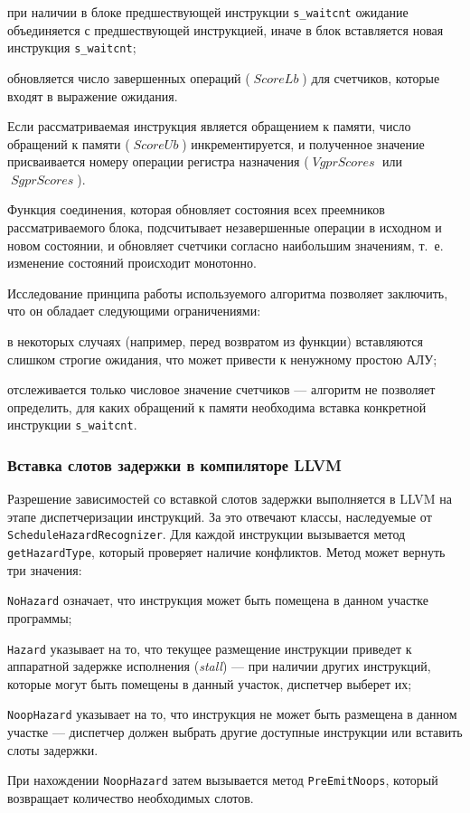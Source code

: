 \documentclass[a4paper,14pt]{extarticle}
\newcommand{\var}[1]{\mathop{\mathit{#1}}}
\begin{document}
{\begin{ol}
  \begin{ul}
  \item при наличии в блоке предшествующей инструкции \verb|s_waitcnt| ожидание объединяется
    с предшествующей инструкцией, иначе в блок вставляется новая инструкция \verb|s_waitcnt|;
  \item обновляется число завершенных операций ($\var{ScoreLb}$) для счетчиков,
    которые входят в выражение ожидания.
  \end{ul}
\item Если рассматриваемая инструкция является обращением к памяти,
  число обращений к памяти ($\var{ScoreUb}$) инкрементируется, и полученное значение
  присваивается номеру операции регистра назначения ($\var{VgprScores}$ или $\var{SgprScores}$).
\end{ol}

Функция соединения, которая обновляет состояния всех преемников рассматриваемого блока,
подсчитывает незавершенные операции в исходном и новом состоянии, и обновляет
счетчики согласно наибольшим значениям, т.~е. изменение состояний происходит монотонно.

Исследование принципа работы используемого алгоритма позволяет заключить, что он обладает
следующими ограничениями:
\begin{ul}
\item в некоторых случаях (например, перед возвратом из функции) вставляются слишком
  строгие ожидания, что может привести к ненужному простою АЛУ;
\item отслеживается только числовое значение счетчиков — алгоритм не позволяет
  определить, для каких обращений к памяти необходима вставка конкретной
  инструкции \verb|s_waitcnt|.
\end{ul}

\subsubsection{Вставка слотов задержки в компиляторе LLVM}
\label{section:gcn-wait-states-llvm}

Разрешение зависимостей со вставкой слотов задержки выполняется в LLVM на этапе
диспетчеризации инструкций. За это отвечают классы, наследуемые от \verb|ScheduleHazardRecognizer|.
Для каждой инструкции вызывается метод \verb|getHazardType|, который проверяет наличие
конфликтов. Метод может вернуть три значения:
\begin{ol}
\item \verb|NoHazard| означает, что инструкция может быть помещена в данном участке программы;
\item \verb|Hazard| указывает на то, что текущее размещение инструкции приведет к аппаратной
  задержке исполнения (\textit{stall}) — при наличии других инструкций, которые
  могут быть помещены в данный участок, диспетчер выберет их;
\item \verb|NoopHazard| указывает на то, что инструкция не может быть размещена в данном
  участке — диспетчер должен выбрать другие доступные инструкции или вставить слоты задержки.
\end{ol}
При нахождении \verb|NoopHazard| затем вызывается метод \verb|PreEmitNoops|, который возвращает
количество необходимых слотов.

}
\end{document}
